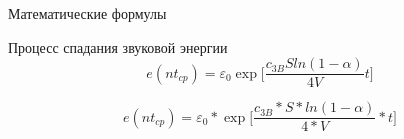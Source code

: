 \begin{frame}[fragile]{Математические формулы}
  \begin{flushleft}
    \Large
    Процесс спадания звуковой энергии
    \begin{equation*}
      e(nt_{cp}) = \varepsilon_0 \exp\Bigg[ \frac{c_{3B} S ln(1 -
        \alpha)}{4V}t \Bigg]
    \end{equation*}
  \end{flushleft}
  \pause
  \begin{latexcode}
    \begin{equation*}
      e(nt_{cp}) = \varepsilon_0  * \exp
      \Bigg[
      \frac{c_{3B} * S * ln(1 -\alpha)} {4 * V} * t
      \Bigg]
    \end{equation*}
  \end{latexcode}
\end{frame}
